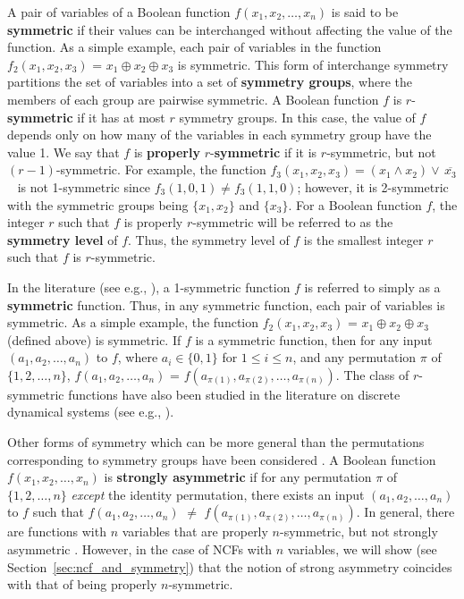 A pair of variables of a Boolean function $f(x_1, x_2, \ldots, x_n)$ is
said to be \textbf{symmetric} if their values can be interchanged without
affecting the value of the function.
As a simple example, each pair of variables in the function 
$f_2(x_1, x_2, x_3)$ = $x_1 \oplus x_2 \oplus x_3$ is symmetric.
This form of interchange symmetry partitions the set of variables into a set of
\textbf{symmetry groups}, where the members of each group are pairwise symmetric.
A Boolean function $f$ is 
$r$-\textbf{symmetric} if it has at most $r$ symmetry groups.
In this case, the value of $f$
depends only on how many of the variables in each symmetry group have the value 1.
We say that $f$ is \textbf{properly} $r$-\textbf{symmetric} if
it is $r$-symmetric, but not $(r-1)$-symmetric.
For example, the function $f_3(x_1, x_2, x_3) = (x_1 \wedge x_2) \vee\, \overline{x_3}$~
is not 1-symmetric since $f_3(1, 0, 1) \neq f_3(1, 1, 0)$; however, 
it is 2-symmetric with the symmetric groups being $\{x_1, x_2\}$ and $\{x_3\}$.
For a Boolean function $f$, the integer $r$ such that $f$ is properly $r$-symmetric
will be referred to as the \textbf{symmetry level} of $f$.
Thus, the symmetry level of $f$ is the smallest integer $r$ such that
$f$ is $r$-symmetric.

In the literature (see e.g., \cite{Crama-Hammer-2011,HT-2016,Toth-etal-1977}),
a 1-symmetric function $f$ is referred to simply
as a \textbf{symmetric} function.
Thus, in any symmetric function, each pair of variables is symmetric.
As a simple example, the function $f_2(x_1, x_2, x_3)$ = 
$x_1 \oplus x_2 \oplus x_3$ (defined above) is symmetric.
If $f$ is a symmetric function, then for any
input $(a_1, a_2, \ldots, a_n)$ to $f$, where $a_i \in \{0,1\}$ for
$1 \leq i \leq n$, and any permutation $\pi$ of $\{1, 2, \ldots, n\}$,
$f(a_1, a_2, \ldots, a_n)$ = $f(a_{\pi(1)}, a_{\pi(2)}, \ldots, a_{\pi(n)})$.
The class of $r$-symmetric functions have also been
studied in the literature on discrete dynamical systems (see e.g., 
\cite{Barrett-etal-2007,Rosenkrantz-etal-2015,MR-2007}).

Other forms of symmetry which can be more general than the permutations 
corresponding to symmetry groups have been considered \cite{KS-2000}.
A Boolean function $f(x_1, x_2, \ldots, x_n)$
is \textbf{strongly asymmetric}
if for any permutation $\pi$ of $\{1, 2, \ldots, n\}$
\emph{except} the identity permutation,
there exists an input $(a_1, a_2, \ldots,  a_n)$
to $f$ such that $f(a_1, a_2, \ldots, a_n)$ $\neq$
$f(a_{\pi(1)}, a_{\pi(2)}, \ldots, a_{\pi(n)})$.
In general, there are functions with $n$ variables that are properly
$n$-symmetric, but not strongly asymmetric \cite{KS-2000}.
However, in the case of NCFs with $n$ variables, we will show 
(see Section~\ref{sec:ncf_and_symmetry}) that the notion of 
strong asymmetry coincides with that 
of being properly $n$-symmetric.

